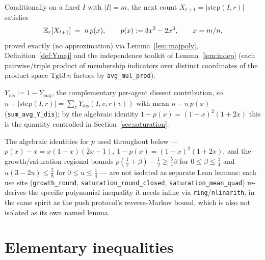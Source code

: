 \begin{lemma}\label{lem:drift}
  \leanok
  Conditionally on a fixed $I$ with $|I|=m$, the next count
  $X_{t+1} = |\mathrm{step}(I,r)|$ satisfies
  \[
    \mathbb{E}_r[X_{t+1}] \;=\; n\,p(x), \qquad p(x) := 3x^2-2x^3, \qquad x = m/n,
  \]
  proved exactly (no approximation) via Lemma~\ref{lem:majpoly},
  Definition~\ref{def:Ymaj} and the independence toolkit of
  Lemma~\ref{lem:indep} (each pairwise/triple product of membership
  indicators over distinct coordinates of the product space
  $\mathrm{Tgt3}\ n$ factors by \texttt{avg\_mul\_prod}).
\end{lemma}

\begin{definition}\label{def:Ydis}
  \leanok
  $Y_{\mathrm{dis}} := 1 - Y_{\mathrm{maj}}$, the complementary per-agent
  dissent contribution, so $n - |\mathrm{step}(I,r)| = \sum_v
  Y_{\mathrm{dis}}(I,v,r(v))$ with mean $n - n\,p(x)$
  (\texttt{sum\_avg\_Y\_dis}); by the algebraic identity
  $1-p(x) = (1-x)^2(1+2x)$ this is the quantity controlled in
  Section~\ref{sec:saturation}.
\end{definition}

\begin{remark}
  The algebraic identities for $p$ used throughout below --- $p(x)-x =
  x(1-x)(2x-1)$, $1-p(x) = (1-x)^2(1+2x)$, and the growth/saturation
  regional bounds $p(\tfrac12+\beta)-\tfrac12 \ge \tfrac54\beta$ for
  $0\le\beta\le\tfrac14$ and $u(3-2u)\le\tfrac58$ for $0\le u\le\tfrac14$ ---
  are not isolated as separate Lean lemmas: each use site
  (\texttt{growth\_round}, \texttt{saturation\_round\_closed},
  \texttt{saturation\_mean\_quad}) re-derives the specific polynomial
  inequality it needs inline via \texttt{ring}/\texttt{nlinarith}, in the
  same spirit as the push protocol's reverse-Markov bound, which is also
  not isolated as its own named lemma.
\end{remark}

\section{Elementary inequalities}\label{sec:ineq}


